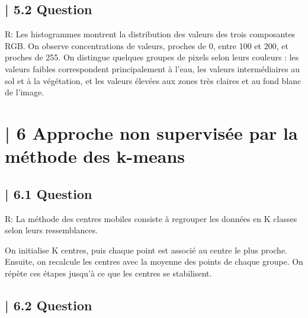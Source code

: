\subsection{| 5.2 Question}

R: Les histogrammes montrent la distribution des valeurs des trois composantes RGB. On observe concentrations de valeurs, proches de 0, entre 100 et 200, et proches de 255. On distingue quelques groupes de pixels selon leurs couleurs : les valeurs faibles correspondent principalement à l’eau, les valeurs intermédiaires au sol et à la végétation, et les valeurs élevées aux zones très claires et au fond blanc de l’image.

\section{| 6 Approche non supervisée par la méthode des k-means}

\subsection{| 6.1 Question}

R: La méthode des centres mobiles consiste à regrouper les données en K classes selon leurs ressemblances.

On initialise K centres, puis chaque point est associé au centre le plus proche. Ensuite, on recalcule les centres avec la moyenne des points de chaque groupe. On répète ces étapes jusqu'à ce que les centres se stabilisent.

\subsection{| 6.2 Question}

